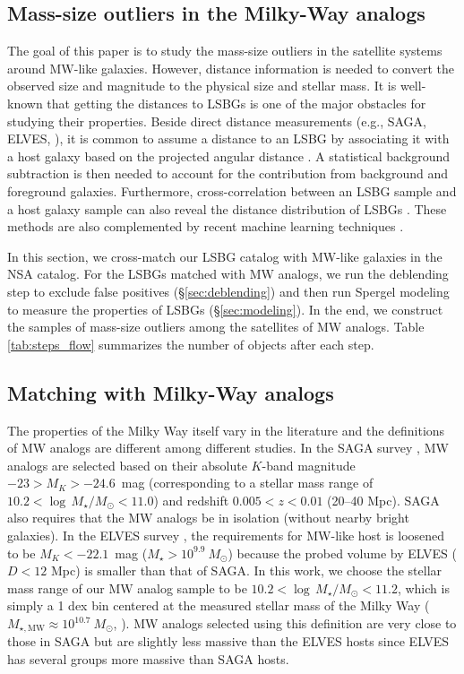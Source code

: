 \documentclass[twocolumn,astrosymb,twocolappendix]{aastex631}
\begin{document}
\begin{CJK*}{UTF8}{gbsn}
\section{Mass-size outliers in the Milky-Way analogs}\label{sec:sample_construction}
The goal of this paper is to study the mass-size outliers in the satellite systems around MW-like galaxies. However, distance information is needed to convert the observed size and magnitude to the physical size and stellar mass. It is well-known that getting the distances to LSBGs is one of the major obstacles for studying their properties. Beside direct distance measurements (e.g., SAGA, ELVES, \citealt{Kadowaki2021}), it is common to assume a distance to an LSBG by associating it with a host galaxy based on the projected angular distance \citep[e.g.,][]{vanDokkum2015,vdBurg2016,Wang2021,Zaritsky2022,Nashimoto2022}. A statistical background subtraction is then needed to account for the contribution from background and foreground galaxies. Furthermore, cross-correlation between an LSBG sample and a host galaxy sample can also reveal the distance distribution of LSBGs \citep{Greene2022}. These methods are also complemented by recent machine learning techniques \citep{Baxter2021,xSAGA-I}. 

In this section, we cross-match our LSBG catalog with MW-like galaxies in the NSA catalog. For the LSBGs matched with MW analogs, we run the deblending step to exclude false positives (\S\ref{sec:deblending}) and then run Spergel modeling to measure the properties of LSBGs (\S\ref{sec:modeling}). In the end, we construct the samples of mass-size outliers among the satellites of MW analogs. Table \ref{tab:steps_flow} summarizes the number of objects after each step. 

\subsection{Matching with Milky-Way analogs}\label{sec:match}
The properties of the Milky Way itself vary in the literature \citep{Licquia2015,Bland-Hawthorn2016} and the definitions of MW analogs are different among different studies. In the SAGA survey \citep{SAGA-I,SAGA-II}, MW analogs are selected based on their absolute $K$-band magnitude $-23 > M_K > -24.6$~mag (corresponding to a stellar mass range of $10.2 < \log\, M_\star/M_\odot < 11.0$) and redshift $0.005 < z < 0.01$ (20--40 Mpc). SAGA also requires that the MW analogs be in isolation (without nearby bright galaxies). In the ELVES survey \citep{ELVES-I,ELVES-II,CarlstenELVES2022}, the requirements for MW-like host is loosened to be $M_K < -22.1$~mag ($M_\star > 10^{9.9}\ M_\odot$) because the probed volume by ELVES ($D<12$ Mpc) is smaller than that of SAGA. In this work, we choose the stellar mass range of our MW analog sample to be $10.2 < \log\, M_\star/M_\odot < 11.2$, which is simply a 1 dex bin centered at the measured stellar mass of the Milky Way ($M_{\star, \mathrm{MW}}\approx 10^{10.7}\ M_\odot$, \citealt{Licquia2015}). MW analogs selected using this definition are very close to those in SAGA but are slightly less massive than the ELVES hosts since ELVES has several groups more massive than SAGA hosts.


\end{CJK*}
\end{document}
